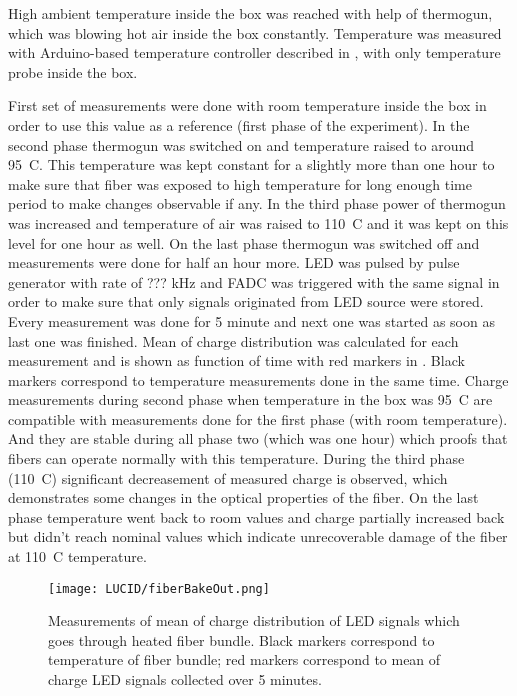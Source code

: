 High ambient temperature inside the box was reached with help of thermogun, which was blowing hot air inside the box constantly.
Temperature was measured with Arduino-based temperature controller described in , with only temperature probe inside the box.

First set of measurements were done with room temperature inside the box in order to use this value as a reference (first phase of the experiment).
In the second phase thermogun was switched on and temperature raised to around 95\degree~C.
This temperature was kept constant for a slightly more than one hour to make sure that fiber was exposed to high temperature for
long enough time period to make changes observable if any. 
In the third phase power of thermogun was increased and temperature of air was raised to 110\degree~C and it was kept on this level for one hour as well.
On the last phase thermogun was switched off and measurements were done for half an hour more.
LED was pulsed by pulse generator with rate of ??? kHz and FADC was triggered with the same signal in order to make sure that only signals originated from LED 
source were stored.
Every measurement was done for 5 minute and next one was started as soon as last one was finished.
Mean of charge distribution was calculated for each measurement and is shown as function of time with red markers in .
Black markers correspond to temperature measurements done in the same time.
Charge measurements during second phase when temperature in the box was 95\degree~C are compatible with measurements done for the first phase 
(with room temperature).
And they are stable during all phase two (which was one hour) which proofs that fibers can operate normally with this temperature.
During the third phase (110\degree~C) significant decreasement of measured charge is observed, which demonstrates some changes in the
optical properties of the fiber. On the last phase temperature went back to room values and charge partially increased back but didn't reach 
nominal values which indicate unrecoverable damage of the fiber at 110\degree~C temperature.

\begin{figure}
\centering
\texttt{[image: LUCID/fiberBakeOut.png]}
\caption{Measurements of mean of charge distribution of LED signals which goes through heated fiber bundle.
Black markers correspond to temperature of fiber bundle; red markers correspond to mean of charge LED signals collected over 5 minutes.}
\label{fig:fiberBakeOut}
\end{figure}

